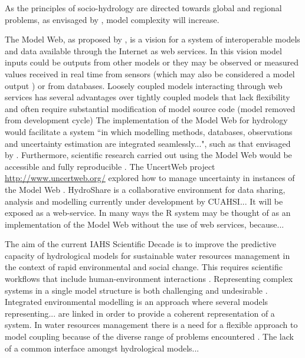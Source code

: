 \documentclass{icldt}\usepackage[]{graphicx}\usepackage[]{color}
\begin{document}
As the principles of socio-hydrology are directed towards global and regional problems, as envisaged by \citep{lall2014}, model complexity will increase.

The Model Web, as proposed by \citet{geller2007}, is a vision for a system of interoperable models and data available through the Internet as web services. In this vision model inputs could be outputs from other models or they may be observed or measured values received in real time from sensors (which may also be considered a model output \citep{geller2007,pebesma2010,beven2012}) or from databases. Loosely coupled models interacting through web services has several advantages over tightly coupled models that lack flexibility and often require substantial modification of model source code  \citep{bulatewicz2012,lu2012} (model removed from development cycle) The implementation of the Model Web for hydrology would facilitate a system ``in which modelling methods, databases, observations and uncertainty estimation are integrated seamlessly...", such as that envisaged by \citet{beven2007}. Furthermore, scientific research carried out using the Model Web would be accessible and fully reproducible \citep{bastin2013}. The UncertWeb project \url{http://www.uncertweb.org/} explored how to manage uncertainty in instances of the Model Web \citep{bastin2013}. HydroShare is a collaborative environment for data sharing, analysis and modelling currently under development by CUAHSI... It will be exposed as a web-service. In many ways the R system may be thought of as an implementation of the Model Web without the use of web services, because... %

The aim of the current IAHS Scientific Decade \citep[Panta Rhei-Everything Flows][]{montanari2013} is to improve the predictive capacity of hydrological models for sustainable water resources management in the context of rapid environmental and social change. This requires scientific workflows that include human-environment interactions \citep{laniak2013,nazemi2015,wheater2015}. Representing complex systems in a single model structure is both challenging and undesirable \citep{}. Integrated environmental modelling is an approach where several models representing... are linked in order to provide a coherent representation of a system. %
In water resources management there is a need for a flexible approach to model coupling because of the diverse range of problems encountered \citep{}. The lack of a common interface amongst hydrological models... \\
\end{document}
